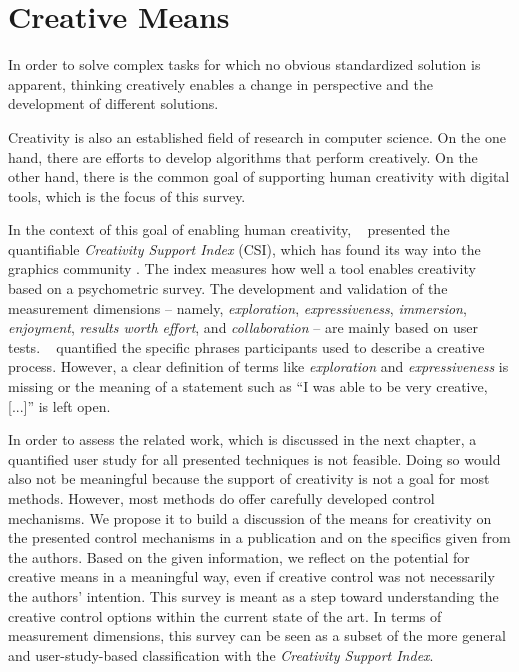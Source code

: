 

\section{Creative Means}
\label{sec:taxo_creativity}

In order to solve complex tasks for which no obvious standardized solution is apparent, thinking creatively enables a change in perspective and the development of different solutions.


Creativity is also an established field of research in computer science. On the one hand, there are efforts to develop algorithms that perform creatively. On the other hand, there is the common goal of supporting human creativity with digital tools, which is the focus of this survey.

In the context of this goal of enabling human creativity, \citeauthor*{cherry_2014_qcs}~\cite{cherry_2014_qcs} presented the quantifiable \textit{Creativity Support Index} (CSI), which has found its way into the graphics community \cite{shugrina_2017_ppi}. The index measures how well a tool enables creativity based on a psychometric survey. The development and validation of the measurement dimensions – namely, \textit{exploration}, \textit{expressiveness}, \textit{immersion}, \textit{enjoyment}, \textit{results worth effort}, and \textit{collaboration} – are mainly based on user tests. \citeauthor*{cherry_2014_qcs}~\cite{cherry_2014_qcs} quantified the specific phrases participants used to describe a creative process. However, a clear definition of terms like  \textit{exploration} and \textit{expressiveness} is missing or the meaning of a statement such as ``I was able to be very creative, [...]'' is left open. 

In order to assess the related work, which is discussed in the next chapter, a quantified user study for all presented techniques is not feasible. Doing so would also not be meaningful because the support of creativity is not a goal for most methods. However, most methods do offer carefully developed control mechanisms. We propose it to build a discussion of the means for creativity on the presented control mechanisms in a publication and on the specifics given from the authors. Based on the given information, we reflect on the potential for creative means in a meaningful way, even if creative control was not necessarily the authors' intention. This survey is meant as a step toward understanding the creative control options within the current state of the art. In terms of measurement dimensions, this survey can be seen as a subset of the more general and user-study-based classification with the \textit{Creativity Support Index}.




